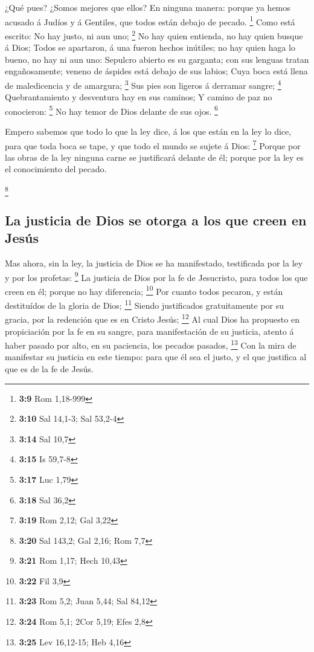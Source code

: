  ¿Qué pues? ¿Somos mejores que ellos? En ninguna manera:
porque ya hemos acusado á Judíos y á Gentiles, que todos están debajo de
pecado. \footnote{\textbf{3:9} Rom 1,18-999}  Como está
escrito: No hay justo, ni aun uno; \footnote{\textbf{3:10} Sal 14,1-3;
  Sal 53,2-4}  No hay quien entienda, no hay quien busque á
Dios;  Todos se apartaron, á una fueron hechos inútiles; no
hay quien haga lo bueno, no hay ni aun uno:  Sepulcro
abierto es su garganta; con sus lenguas tratan engañosamente; veneno de
áspides está debajo de sus labios;  Cuya boca está llena de
maledicencia y de amargura; \footnote{\textbf{3:14} Sal 10,7}
 Sus pies son ligeros á derramar sangre; \footnote{\textbf{3:15}
  Is 59,7-8}  Quebrantamiento y desventura hay en sus
caminos;  Y camino de paz no conocieron: \footnote{\textbf{3:17}
  Luc 1,79}  No hay temor de Dios delante de sus ojos.
\footnote{\textbf{3:18} Sal 36,2}

 Empero sabemos que todo lo que la ley dice, á los que
están en la ley lo dice, para que toda boca se tape, y que todo el mundo
se sujete á Dios: \footnote{\textbf{3:19} Rom 2,12; Gal 3,22}
 Porque por las obras de la ley ninguna carne se
justificará delante de él; porque por la ley es el conocimiento del
pecado.

\footnote{\textbf{3:20} Sal 143,2; Gal 2,16; Rom 7,7}

\hypertarget{la-justicia-de-dios-se-otorga-a-los-que-creen-en-jesuxfas}{%
\subsection{La justicia de Dios se otorga a los que creen en
Jesús}\label{la-justicia-de-dios-se-otorga-a-los-que-creen-en-jesuxfas}}

 Mas ahora, sin la ley, la justicia de Dios se ha
manifestado, testificada por la ley y por los profetas: \footnote{\textbf{3:21}
  Rom 1,17; Hech 10,43}  La justicia de Dios por la fe de
Jesucristo, para todos los que creen en él; porque no hay diferencia;
\footnote{\textbf{3:22} Fil 3,9}  Por cuanto todos pecaron,
y están destituídos de la gloria de Dios; \footnote{\textbf{3:23} Rom
  5,2; Juan 5,44; Sal 84,12}  Siendo justificados
gratuitamente por su gracia, por la redención que es en Cristo Jesús;
\footnote{\textbf{3:24} Rom 5,1; 2Cor 5,19; Efes 2,8}  Al
cual Dios ha propuesto en propiciación por la fe en su sangre, para
manifestación de su justicia, atento á haber pasado por alto, en su
paciencia, los pecados pasados, \footnote{\textbf{3:25} Lev 16,12-15;
  Heb 4,16}  Con la mira de manifestar su justicia en este
tiempo: para que él sea el justo, y el que justifica al que es de la fe
de Jesús.

